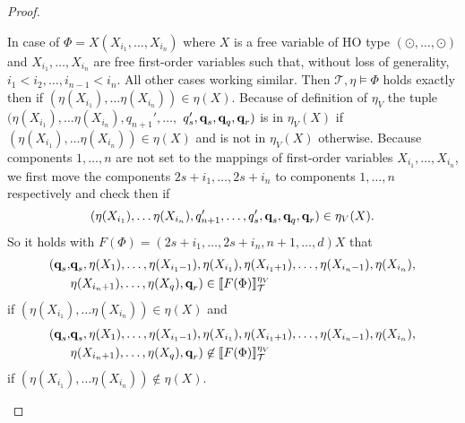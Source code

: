 \begin{proof}
\begin{compactitem}
        \item In case of $\Phi = X(X_{i_1}, \dots, X_{i_n})$ where $X$ is a free variable of HO type $(\odot, \dots,
        \odot)$ and $X_{i_1}, \dots, X_{i_n}$ are free first-order variables such that, without loss of generality, $i_1 < i_2, \dots, i_{n-1} < i_n$. All other cases working similar. Then $\mathcal{T}, \eta \models \Phi$
        holds exactly then if $(\eta(X_{i_1}), \dots \eta(X_{i_n})) \in \eta(X)$. Because of definition of $\eta_V$ the
        tuple $(\eta(X_{i_1}), \dots \eta(X_{i_n}), q_{n + 1}', \dots,$ $ q_{s}', \emph{q}_s, \emph{q}_q, \emph{q}_r)$ is in $
        \eta_V(X)$ if $(\eta(X_{i_1}),\dots \eta(X_{i_n})) \in \eta(X)$ and is not in $\eta_V(X)$ otherwise. Because
         components $1, \dots, n$ are not set to the mappings of first-order variables $X_{i_1}, \dots, X_{i_n}$, we first move the components $2s+i_1, \dots, 2s+i_n$ to components $1, \dots, n$ respectively and check then if
        \[(\eta(X_{i_1}), \dots \eta(X_{i_n}), q_{n + 1}', \dots, q_{s}', \emph{q}_s, \emph{q}_q, \emph{q}_r) \in \eta_V(X).\]
        So it holds with $F(\Phi) = {(2s+i_1, \dots, 2s+i_n, n+1, \dots, d)}X$ that
        \begin{align*}
            (\emph{q}_s, &\emph{q}_s, \eta(X_1), \dots, \eta(X_{i_1-1}), \eta(X_{i_1}), \eta(X_{i_1+1}), \dots, \eta(X_{i_n-1}), \eta(X_{i_n}), \\&\eta(X_{i_n+1}), \dots, \eta
            (X_q), \emph{q}_r) \in \llbracket F(\Phi) \rrbracket^{\eta_V
            }_\mathcal{T}
        \end{align*}
        if $(\eta(X_{i_1}), \dots \eta(X_{i_n})) \in \eta(X)$ and
        \begin{align*}
            (\emph{q}_s, &\emph{q}_s, \eta(X_1), \dots, \eta(X_{i_1-1}), \eta(X_{i_1}), \eta(X_{i_1+1}), \dots, \eta(X_{i_n-1}), \eta(X_{i_n}), \\&\eta(X_{i_n+1}), \dots, \eta
            (X_q), \emph{q}_r) \not \in \llbracket F(\Phi) \rrbracket^{\eta_V
            }_\mathcal{T}
        \end{align*}
        if $(\eta(X_{i_1}), \dots \eta(X_{i_n})) \not\in \eta(X)$.


\end{compactitem}
\end{proof}
